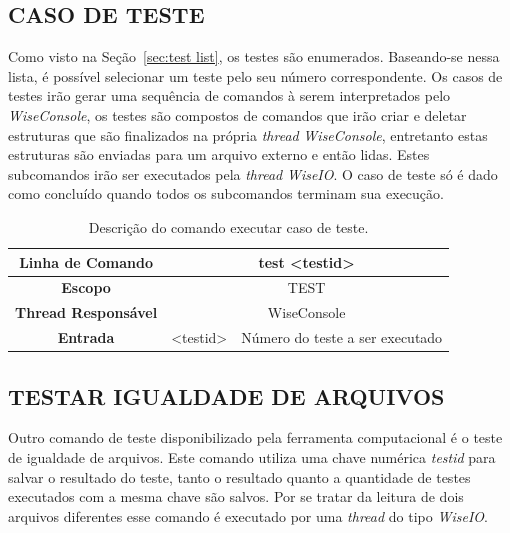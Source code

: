 \subsection{CASO DE TESTE}\label{sec:case list}

Como visto na Seção~\ref{sec:test list}, os testes são enumerados. Baseando-se nessa lista, é possível selecionar um teste pelo seu número correspondente. Os casos de testes irão gerar uma sequência de comandos à serem interpretados pelo \textit{WiseConsole}, os testes são compostos de comandos que irão criar e deletar estruturas que são finalizados na própria \textit{thread} \textit{WiseConsole}, entretanto estas estruturas são enviadas para um arquivo externo e então lidas. Estes subcomandos irão ser executados pela \textit{thread} \textit{WiseIO}. O caso de teste só é dado como concluído quando todos os subcomandos terminam sua execução.

\begin{center}
	\begin{table}[!htbp]
		\begin{tabularx}{\textwidth}{c|c|X}
			\toprule
			\textbf{Linha de Comando} & \multicolumn{2}{c}{test <test\underline{\space}id>} \\
			\midrule
			\textbf{Escopo} & \multicolumn{2}{c}{TEST} \\
			\hline
			\textbf{Thread Responsável} & \multicolumn{2}{c}{WiseConsole} \\
			\hline
			\textbf{Entrada} & <test\underline{\space}id> & Número do teste a ser executado \\
			\bottomrule
		\end{tabularx}
		\caption{Descrição do comando executar caso de teste.}
		\label{tab:case_test}
	\end{table}
\end{center}

\subsection{TESTAR IGUALDADE DE ARQUIVOS}\label{sec:test_file}

Outro comando de teste disponibilizado pela ferramenta computacional é o teste de igualdade de arquivos. Este comando utiliza uma chave numérica \textit{test\underline{\space}id} para salvar o resultado do teste, tanto o resultado quanto a quantidade de testes executados com a mesma chave são salvos. Por se tratar da leitura de dois arquivos diferentes esse comando é executado por uma \textit{thread} do tipo \textit{WiseIO}.

